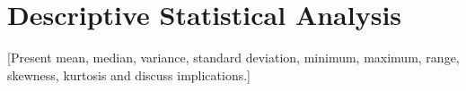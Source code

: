 \section{Descriptive Statistical Analysis}
{} [Present mean, median, variance, standard deviation, minimum, maximum, range, skewness, kurtosis and discuss implications.]

\begin{Shaded}
\begin{Highlighting}[]
\end{Highlighting}
\end{Shaded}
